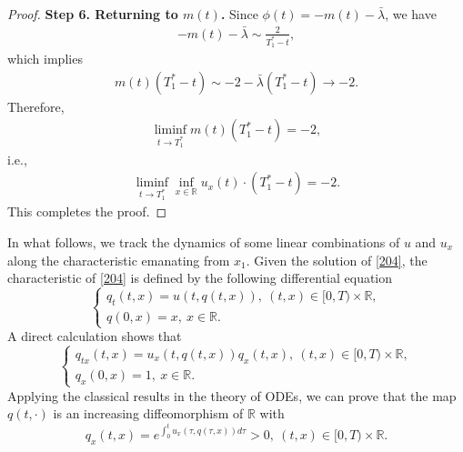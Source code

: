 \documentclass[preprint,12pt]{elsarticle}
\numberwithin{equation}{section}
\begin{document}
\begin{proof}
\noindent\textbf{Step 6. Returning to $m(t)$.}
Since $\phi(t) = -m(t) - \bar\lambda$, we have
\begin{align*}
-m(t) - \bar\lambda \sim \frac{2}{T_{1}^* - t},
\end{align*}
which implies
\begin{align*}
m(t)(T_{1}^* - t) \sim -2 - \bar\lambda (T_{1}^* - t) \to -2.
\end{align*}
Therefore,
\begin{align*}
\liminf_{t \to T_{1}^*} m(t)(T_{1}^* - t) = -2,
\end{align*}
i.e.,
\begin{align*}
\liminf_{t \to T_{1}^*} \inf_{x\in \mathbb{R}}u_{x}(t) \cdot (T_{1}^* - t) = -2.
\end{align*}
This completes the proof.
\end{proof}


In what follows, we track the dynamics of some linear combinations of $u$ and $u_{x}$ along the characteristic emanating from $x_1$. Given the solution of \eqref{204}, the characteristic of \eqref{204} is defined by the following differential equation
\begin{equation}
\begin{cases}
q_{t}(t,x)=u(t,q(t,x)),\ (t,x)\in[0,T)\times\mathbb{R},\\
q(0,x)=x,\ x\in \mathbb{R}.
\end{cases}
\label{2029}
\end{equation}
A direct calculation shows that
\begin{equation*}
\begin{cases}
q_{tx}(t,x)=u_{x}(t,q(t,x))q_{x}(t,x),\ (t,x)\in[0,T)\times\mathbb{R},\\
q_{x}(0,x)=1,\ x\in \mathbb{R}.
\end{cases}
\end{equation*}
Applying the classical results in the theory of ODEs, we can prove that the map $q(t,\cdot)$ is an increasing diffeomorphism of  $\mathbb{R}$ with
$$q_{x}(t,x)=e^{\int_{0}^{t}u_{x}(\tau,q(\tau,x))d\tau}>0,\ (t,x)\in [0,T)\times \mathbb{R}.$$
\end{document}
